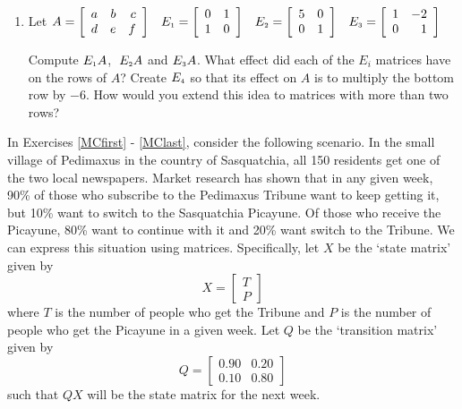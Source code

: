 \begin{enumerate}
\setcounter{enumi}{\value{HW}}

\item Let $A = \left[ \begin{array}{rrr} a & b & c \\ d & e & f \end{array} \right] \;\;\; E_{\mbox{\tiny$1$}} = \left[ \begin{array}{rr} 0 & 1 \\ 1 & 0 \end{array} \right] \;\;\; E_{\mbox{\tiny$2$}} = \left[ \begin{array}{rr} 5 & 0 \\ 0 & 1 \end{array} \right] \;\;\; E_{\mbox{\tiny$3$}} = \left[ \begin{array}{rr} 1 & -2 \\ 0 & 1 \end{array} \right]$ 

\smallskip

 Compute $E_{\mbox{\tiny$1$}}A$, $\; E_{\mbox{\tiny$2$}}A$ and $E_{\mbox{\tiny$3$}}A$.  What effect did each of the $E_{i}$ matrices have on the rows of $A$?  Create $E_{\mbox{\tiny$4$}}$ so that its effect on $A$ is to multiply the bottom row by $-6$.  How would you extend this idea to matrices with more than two rows?
\setcounter{HW}{\value{enumi}}
\end{enumerate}

\label{Markovchain} 

In Exercises \ref{MCfirst} - \ref{MClast}, consider the following scenario. In the small village of Pedimaxus in the country of Sasquatchia, all 150 residents get one of the two local newspapers.  Market research has shown that in any given week, 90\% of those who subscribe to the Pedimaxus Tribune want to keep getting it, but 10\% want to switch to the Sasquatchia Picayune.  Of those who receive the Picayune, 80\% want to continue with it and 20\% want switch to the Tribune.  We can express this situation using matrices.  Specifically, let $X$ be the `state matrix' given by \[X = \left[ \begin{array}{r} T \\ P \end{array} \right]\] where $T$ is the number of people who get the Tribune and $P$ is the number of people who get the Picayune in a given week.  Let $Q$ be the `transition matrix' given by \[Q = \left[ \begin{array}{rr} 0.90 & 0.20 \\ 0.10 & 0.80 \end{array} \right]\] such that $QX$ will be the state matrix for the next week. 


